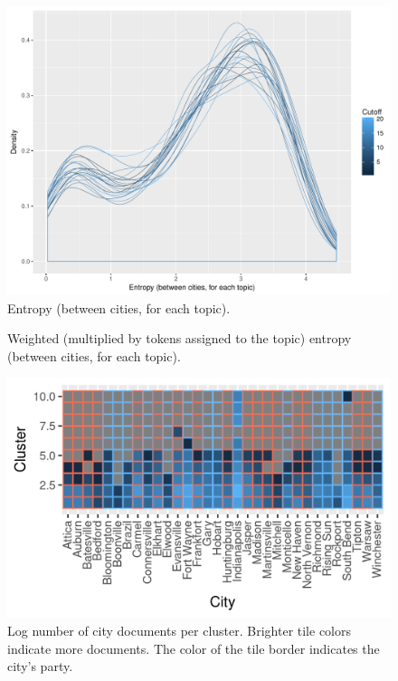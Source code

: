 \documentclass[11pt]{article}
\begin{document}
\begin{figure}[!ht]
	\centering %
	\caption{Entropy (between cities, for each topic).}
	\label{cutoffEntropy}
	\includegraphics[width=\linewidth]{figures/CutoffCityEntropy.pdf}
\end{figure}

\begin{figure}[!ht]
	\centering %
	\caption{Weighted (multiplied by tokens assigned to the topic) entropy (between cities, for each topic).}
	\label{cutoffEntropy}
\end{figure}

\begin{figure}[!ht]
	\centering
	\caption{Log number of city documents per cluster. Brighter tile colors indicate more documents. The color of the tile border indicates the city's party.}
	\label{hclustCity10}
	\includegraphics[width=\linewidth]{figures/heatmap_hclust_10.png}
\end{figure}
\end{document}
